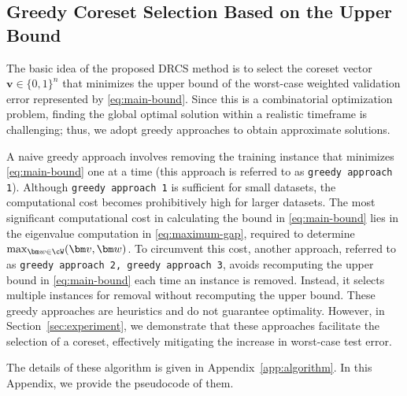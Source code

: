 



\subsection{Greedy Coreset Selection Based on the Upper Bound}
\label{subsec:GrCS}
%
The basic idea of the proposed DRCS method is to select the coreset vector $\bm v \in \{0, 1\}^n$ that minimizes the upper bound of the worst-case weighted validation error represented by \eqref{eq:main-bound}.
%
Since this is a combinatorial optimization problem, finding the global optimal solution within a realistic timeframe is challenging; thus, we adopt greedy approaches to obtain approximate solutions.
%

A naive greedy approach involves removing the training instance that minimizes \eqref{eq:main-bound} one at a time (this approach is referred to as {\tt greedy approach 1}).
%
Although {\tt greedy approach 1} is sufficient for small datasets, the computational cost becomes prohibitively high for larger datasets.
%
The most significant computational cost in calculating the bound in \eqref{eq:main-bound} lies in the eigenvalue computation in \eqref{eq:maximum-gap}, required to determine ${\rm max}_{\bm w \in \cW}(\bm v, \bm w)$.
%
To circumvent this cost, another approach, referred to as {\tt greedy approach 2, greedy approach 3}, avoids recomputing the upper bound in \eqref{eq:main-bound} each time an instance is removed.
%
Instead, it selects multiple instances for removal without recomputing the upper bound.
%
These greedy approaches are heuristics and do not guarantee optimality. However, in Section~\ref{sec:experiment}, we demonstrate that these approaches facilitate the selection of a coreset, effectively mitigating the increase in worst-case test error.

The details of these algorithm is given in {Appendix~\ref{app:algorithm}}. In this Appendix, we provide the pseudocode of them.